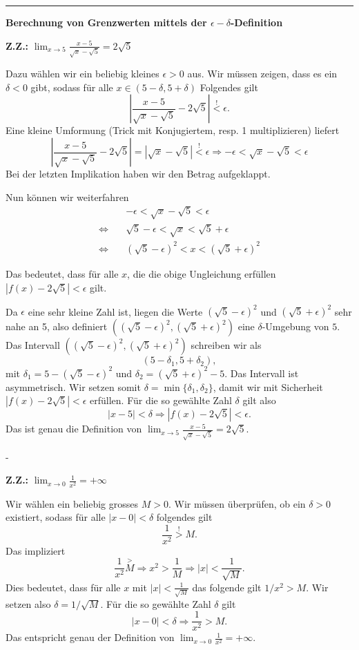 \documentclass[a4paper,landscape,8pt]{extarticle}
\newcommand{\abs}[1]{\left\lvert #1 \right\rvert}
\newcommand{\sep}{\vspace{5pt}\noindent\hrule\vspace{5pt}}
\newcommand{\ZZ}{\textbf{Z.Z.: }}
\begin{document}
\begin{multicols*}{4}
\begin{warmup}
\sep

\textbf{Berechnung von Grenzwerten mittels der $\epsilon-\delta$-Definition}

\Bsp \ZZ $\lim_{x\to 5} \frac{x-5}{\sqrt{x}-\sqrt{5}}=2\sqrt{5}$

Dazu wählen wir ein beliebig kleines $\epsilon > 0$ aus. Wir müssen zeigen, dass
es ein $\delta<0$ gibt, sodass für alle $x\in(5-\delta,5+\delta)$ Folgendes gilt
\[
\abs{\frac{x-5}{\sqrt{x}-\sqrt{5}}-2\sqrt{5}} \stackrel{!}{<} \epsilon.
\]
Eine kleine Umformung (Trick mit Konjugiertem, resp. 1 multiplizieren) liefert
\[
\abs{\frac{x-5}{\sqrt{x}-\sqrt{5}}-2\sqrt{5}} = \abs{\sqrt{x}-\sqrt{5}}
\stackrel{!}{<} \epsilon
\Longrightarrow
-\epsilon< \sqrt{x} - \sqrt{5} < \epsilon
\]
\Trick Bei der letzten Implikation haben wir den Betrag aufgeklappt.

Nun können wir weiterfahren
\begin{align*}
&-\epsilon < \sqrt{x} - \sqrt{5} < \epsilon\\
\Longleftrightarrow \quad
&\sqrt{5}-\epsilon < \sqrt{x} < \sqrt{5} + \epsilon\\
\Longleftrightarrow \quad
&(\sqrt{5}-\epsilon)^2 < x < (\sqrt{5} + \epsilon)^2
\end{align*}

Das bedeutet, dass für alle $x$, die die obige Ungleichung erfüllen
$\abs{f(x)-2\sqrt{5}}<\epsilon $ gilt.

Da $\epsilon$ eine sehr kleine Zahl ist, liegen die Werte
$(\sqrt{5}-\epsilon)^2$ und $(\sqrt{5} + \epsilon)^2$ sehr nahe an 5, also
definiert $((\sqrt{5}-\epsilon)^2,(\sqrt{5} + \epsilon)^2)$ eine
$\delta$-Umgebung von $5$. Das Intervall $((\sqrt{5}-\epsilon)^2,(\sqrt{5} +
\epsilon)^2)$ schreiben wir als
\[
(5-\delta_1,5+\delta_2),
\]
mit $\delta_1= 5-(\sqrt{5}-\epsilon)^2$ und $\delta_2= (\sqrt{5}+\epsilon)^2-5$.
Das Intervall ist asymmetrisch.  Wir setzen somit $\delta =
\min\{\delta_1,\delta_2\}$, damit wir mit Sicherheit
$\abs{f(x)-2\sqrt{5}}<\epsilon$ erfüllen. Für die so gewählte Zahl $\delta$ gilt
also
\[
\abs{x-5}<\delta \Longrightarrow \abs{f(x)-2\sqrt{5}}<\epsilon.
\]
Das ist genau die Definition von $\lim_{x\to 5}
\frac{x-5}{\sqrt{x}-\sqrt{5}}=2\sqrt{5}$.

-

\Bsp \ZZ $\lim_{x\to 0}\frac{1}{x^2}=+\infty$

Wir wählen ein beliebig grosses $M>0$. Wir müssen überprüfen, ob ein $\delta>0$
existiert, sodass für alle $\abs{x-0}<\delta$ folgendes gilt
\[
\frac{1}{x^2}\stackrel{!}{>}M.
\]
Das impliziert
\[
\frac{1}{x^2}\stackrel > M \Longrightarrow
x^2 > \frac{1}{M} \Longrightarrow
\abs{x}<\frac{1}{\sqrt{M}}.
\]
Dies bedeutet, dass für alle $x$ mit $\abs{x}<\frac{1}{\sqrt{M}}$ das folgende
gilt $1/x^2 > M$. Wir setzen also $\delta = 1/\sqrt{M}$. Für die so gewählte
Zahl $\delta$ gilt
\[
\abs{x-0}<\delta \Longrightarrow \frac{1}{x^2} > M.
\]
Das entspricht genau der Definition von $\lim_{x\to 0}\frac{1}{x^2}=+\infty$.



\end{warmup}
\end{multicols*}
\end{document}

